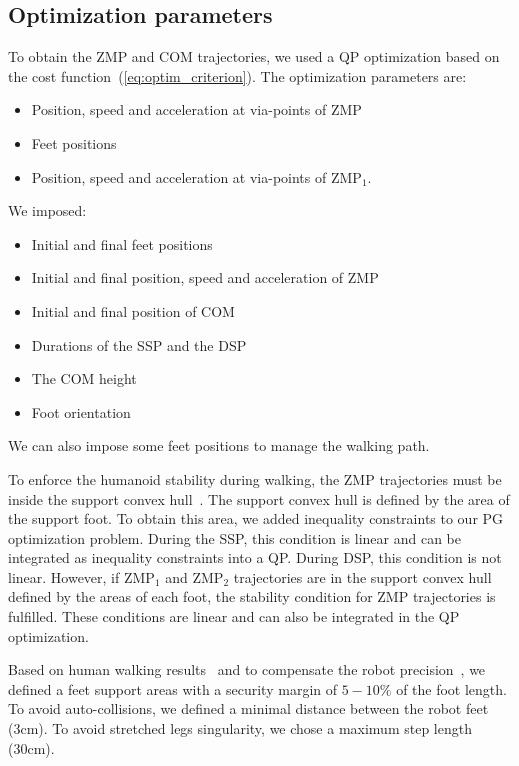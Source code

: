 \documentclass[journal]{IEEEtran}
\begin{document}
\subsection{Optimization parameters}
To obtain the ZMP and COM trajectories, we used a QP optimization based on the cost function~(\ref{eq:optim_criterion}). The optimization parameters are: 
\begin{itemize}
	\item Position, speed and acceleration at via-points of ZMP
	\item Feet positions
	\item Position, speed and acceleration at via-points of ZMP$_1$.	
\end{itemize}
We imposed:
\begin{itemize}
	\item Initial and final feet positions
	\item Initial and final position, speed and acceleration of ZMP
	\item Initial and final position of COM
	\item Durations of the SSP and the DSP
	\item The COM height
	\item Foot orientation
\end{itemize}
We can also impose some feet positions to manage the walking path.

To enforce the humanoid stability during walking, the ZMP trajectories must be inside the support convex hull~\cite{Vukabratovic1969}\cite{vukobratovic:ijhr:2004}. The support convex hull is defined by the area of the support foot. To obtain this area, we added inequality constraints to our PG optimization problem. During the SSP, this condition is linear and can be integrated as inequality constraints into a QP. During DSP, this condition is not linear. However, if ZMP$_1$ and ZMP$_2$ trajectories are in the support convex hull defined by the areas of each foot, the stability condition for ZMP trajectories is fulfilled. These conditions are linear and can also be integrated in the QP optimization.

Based on human walking results~\cite{popovic:ijrr:2005} and to compensate the robot precision~\cite{kajita:springer:2008}, we defined a feet support areas with a security margin of $5-10\%$ of the foot length. To avoid auto-collisions, we defined a minimal distance between the robot feet (3cm). To avoid stretched legs singularity, we chose a maximum step length (30cm).
\end{document}
